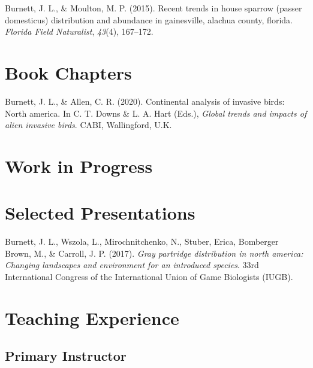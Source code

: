 \documentclass[11pt,a4paper,]{awesome-cv}
\begin{document}
\leavevmode{}%
Burnett, J. L., \& Moulton, M. P. (2015). Recent trends in house sparrow
(passer domesticus) distribution and abundance in gainesville, alachua
county, florida. \emph{Florida Field Naturalist}, \emph{43}(4),
167--172.

\hypertarget{book-chapters}{%
\section{Book Chapters}\label{book-chapters}}

\hypertarget{bibliography}{}
\leavevmode{}%
Burnett, J. L., \& Allen, C. R. (2020). Continental analysis of invasive
birds: North america. In C. T. Downs \& L. A. Hart (Eds.), \emph{Global
trends and impacts of alien invasive birds}. CABI, Wallingford, U.K.

\hypertarget{work-in-progress}{%
\section{Work in Progress}\label{work-in-progress}}

\hypertarget{selected-presentations}{%
\section{Selected Presentations}\label{selected-presentations}}

\hypertarget{bibliography}{}
\leavevmode{}%
Burnett, J. L., Wszola, L., Mirochnitchenko, N., Stuber, Erica,
Bomberger Brown, M., \& Carroll, J. P. (2017). \emph{Gray partridge
distribution in north america: Changing landscapes and environment for
an introduced species}. 33rd International Congress of the International
Union of Game Biologists (IUGB).

\hypertarget{teaching-experience}{%
\section{Teaching Experience}\label{teaching-experience}}

\hypertarget{primary-instructor}{%
\subsection{Primary Instructor}\label{primary-instructor}}

\begin{cventries}
    \vspace{-4.0mm}
\end{cventries}
\end{document}
